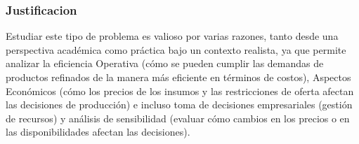 \documentclass[conference]{IEEEtran}
\begin{document}
\subsubsection{Justificacion}

Estudiar este tipo de problema es valioso por varias razones, tanto desde
una perspectiva académica como práctica bajo un contexto realista, ya que
permite analizar la eficiencia Operativa (cómo se pueden cumplir las
demandas de productos refinados de la manera más eficiente en términos
de costos), Aspectos Económicos (cómo los precios de los insumos y
las restricciones de oferta afectan las decisiones de producción) e
incluso toma de decisiones empresariales (gestión de recursos) y
análisis de sensibilidad (evaluar cómo cambios en los precios o en las
disponibilidades afectan las decisiones).


\end{document}
